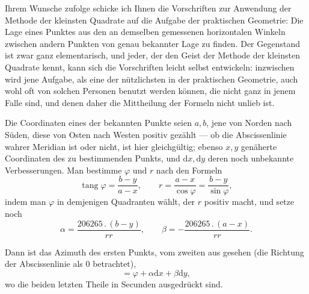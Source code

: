 Ihrem Wunsche zufolge schicke ich Ihnen die Vorschriften zur Anwendung der Methode der kleinsten Quadrate auf die Aufgabe der praktischen Geometrie: Die Lage eines Punktes aus den an demselben gemessenen horizontalen Winkeln zwischen andern Punkten von genau bekannter Lage zu finden. Der Gegenstand ist zwar ganz elementarisch, und jeder, der den Geist der Methode der kleinsten Quadrate kennt, kann sich die Vorschriften leicht selbst entwickeln: inzwischen wird jene Aufgabe, als eine der nützlichsten in der praktischen Geometrie, auch wohl oft von solchen Personen benutzt werden können, die nicht ganz in jenem Falle sind, und denen daher die Mittheilung der Formeln nicht unlieb ist.

Die Coordinaten eines der bekannten Punkte seien \(a,b\), jene von Norden nach Süden, diese von Osten nach Westen positiv gezählt — ob die Abscissenlinie wahrer Meridian ist oder nicht, ist hier gleichgültig; ebenso \(x,y\) genäherte Coordinaten des zu bestimmenden Punkts, und \(\mathrm{d}x,\mathrm{d}y\) deren noch unbekannte Verbesserungen. Man bestimme \(\varphi\) und \(r\) nach den Formeln
\[
 \operatorname{tang}\varphi=\frac{b-y}{a-x},\qquad
 r=\frac{a-x}{\cos\varphi}=\frac{b-y}{\sin\varphi},
\]
\noindent indem man \(\varphi\) in demjenigen Quadranten wählt, der \(r\) positiv macht, und setze noch
\[
 \alpha=\frac{206265\,.\,(b-y)}{rr},\qquad
 \beta=-\frac{206265\,.\,(a-x)}{rr}.
\]

Dann ist das Azimuth des ersten Punkts, vom zweiten aus gesehen (die Richtung der Abscissenlinie als \(0\) betrachtet),
\[
 =\varphi+\alpha\mathrm{d}x+\beta\mathrm{d}y,
\]
\noindent wo die beiden letzten Theile in Secunden ausgedrückt sind.
